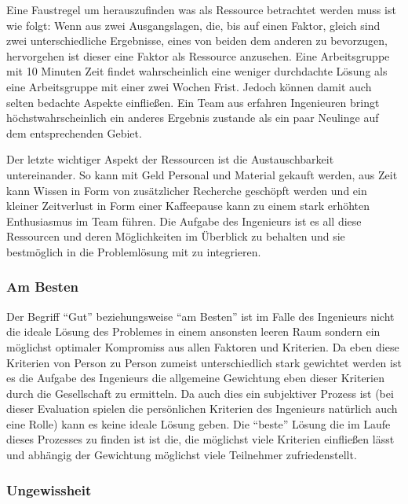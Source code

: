     Eine Faustregel um herauszufinden was als Ressource betrachtet werden muss ist wie folgt: Wenn 
    aus zwei Ausgangslagen, die, bis auf einen Faktor, gleich sind zwei unterschiedliche Ergebnisse, 
    eines von beiden dem anderen zu bevorzugen, hervorgehen ist dieser eine Faktor als Ressource 
    anzusehen. Eine Arbeitsgruppe mit 10 Minuten Zeit findet wahrscheinlich eine weniger durchdachte 
    Lösung als eine Arbeitsgruppe mit einer zwei Wochen Frist. Jedoch können damit auch selten bedachte
    Aspekte einfließen. Ein Team aus erfahren Ingenieuren bringt höchstwahrscheinlich ein anderes 
    Ergebnis zustande als ein paar Neulinge auf dem entsprechenden Gebiet.

    Der letzte wichtiger Aspekt der Ressourcen ist die Austauschbarkeit untereinander. So kann mit Geld 
    Personal und Material gekauft werden, aus Zeit kann Wissen in Form von zusätzlicher Recherche geschöpft
    werden und ein kleiner Zeitverlust in Form einer Kaffeepause kann zu einem stark erhöhten 
    Enthusiasmus im Team führen. Die Aufgabe des Ingenieurs ist es all diese Ressourcen und deren 
    Möglichkeiten im Überblick zu behalten und sie bestmöglich in die Problemlösung mit zu integrieren.

    \subsubsection{Am Besten}

    Der Begriff “Gut” beziehungsweise “am Besten” ist im Falle des Ingenieurs nicht die ideale 
    Lösung des Problemes in einem ansonsten leeren Raum sondern ein möglichst optimaler Kompromiss 
    aus allen Faktoren und Kriterien. Da eben diese Kriterien von Person zu Person zumeist 
    unterschiedlich stark gewichtet werden ist es die Aufgabe des Ingenieurs die allgemeine 
    Gewichtung eben dieser Kriterien durch die Gesellschaft zu ermitteln. Da auch dies ein subjektiver 
    Prozess ist (bei dieser Evaluation  spielen die persönlichen Kriterien des Ingenieurs natürlich 
    auch eine Rolle) kann es keine ideale Lösung geben. Die “beste” Lösung die im Laufe dieses 
    Prozesses zu finden ist ist die, die möglichst viele Kriterien einfließen lässt und abhängig 
    der Gewichtung möglichst viele Teilnehmer zufriedenstellt.

    \subsubsection{Ungewissheit}

